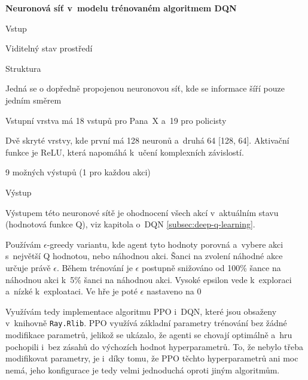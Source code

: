     \textbf{Neuronová síť v~modelu trénovaném algoritmem DQN}
    \begin{myitemize}
      \item Vstup
        \begin{myitemize}
          \item Viditelný stav prostředí
        \end{myitemize}
      \item Struktura
        \begin{myitemize}
          \item Jedná se o dopředně propojenou neuronovou síť, kde se informace šíří pouze jedním směrem
          \item Vstupní vrstva má 18 vstupů pro Pana~X a~19 pro policisty
          \item Dvě skryté vrstvy, kde první má 128 neuronů a~druhá 64 [128, 64]. Aktivační funkce je ReLU, která napomáhá k~učení komplexních závislostí.
          \item 9 možných výstupů (1 pro každou akci)
        \end{myitemize}
      \item Výstup
        \begin{myitemize}
          \item Výstupem této neuronové sítě je ohodnocení všech akcí v~aktuálním stavu (hodnotová funkce Q), viz kapitola o~DQN \ref{subsec:deep-q-learning}.
          \item Používám $\epsilon$-greedy variantu, kde agent tyto hodnoty porovná a~vybere akci s~největší Q hodnotou, nebo náhodnou akci.
          Šanci na zvolení náhodné akce určuje právě $\epsilon$. Během trénování je $\epsilon$ postupně snižováno od 100\% šance na náhodnou akci k~5\% šanci na náhodnou akci.
          Vysoké epsilon vede k~exploraci a~nízké k~exploataci. Ve hře je poté $\epsilon$ nastaveno na 0%
        \end{myitemize}
    \end{myitemize}

  \bigskip

Využívám tedy implementace algoritmu PPO i~DQN, které jsou obsaženy v~knihovně \texttt{Ray.Rlib}.
PPO využívá základní parametry trénování bez žádné modifikace parametrů, jelikož se ukázalo, že agenti se chovají optimálně a~hru pochopili i~bez zásahů do výchozích hodnot hyperparametrů.
To, že nebylo třeba modifikovat parametry, je i~díky tomu, že PPO těchto hyperparametrů ani moc nemá, jeho konfigurace je tedy velmi jednoduchá oproti jiným algoritmům.

